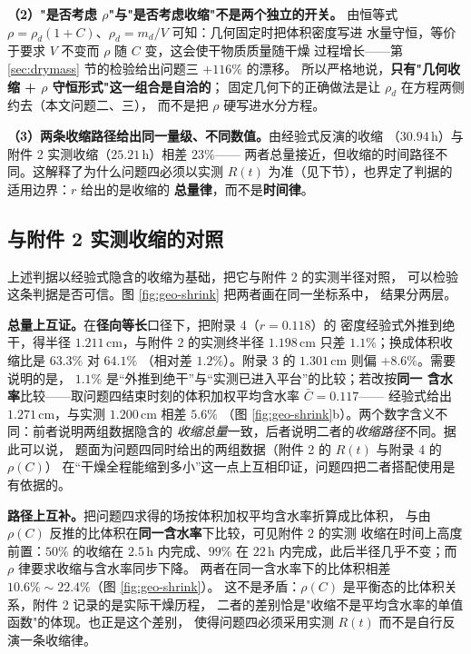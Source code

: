 \documentclass[12pt,a4paper,fontset=none]{ctexart}
\begin{document}
\textbf{（2）"是否考虑 $\rho$"与"是否考虑收缩"不是两个独立的开关。}
由恒等式 $\rho=\rho_d(1+C)$、$\rho_d=m_d/V$ 可知：几何固定时把体积密度写进
水量守恒，等价于要求 $V$ 不变而 $\rho$ 随 $C$ 变，这会使干物质质量随干燥
过程增长——第 \ref{sec:drymass} 节的检验给出问题三 $+116\%$ 的漂移。
所以严格地说，\textbf{只有"几何收缩 + $\rho$ 守恒形式"这一组合是自洽的}；
固定几何下的正确做法是让 $\rho_d$ 在方程两侧约去（本文问题二、三），
而不是把 $\rho$ 硬写进水分方程。

\textbf{（3）两条收缩路径给出同一量级、不同数值。}由经验式反演的收缩
（$30.94$\,h）与附件 2 实测收缩（$25.21$\,h）相差 $23\%$——
两者总量接近，但收缩的时间路径不同。这解释了为什么问题四必须以实测
$R(t)$ 为准（见下节），也界定了判据的适用边界：$r$ 给出的是收缩的
\textbf{总量律}，而不是\textbf{时间律}。

\subsection{与附件 2 实测收缩的对照}
\label{sec:p11-crosscheck}

上述判据以经验式隐含的收缩为基础，把它与附件 2 的实测半径对照，
可以检验这条判据是否可信。图 \ref{fig:geo-shrink} 把两者画在同一坐标系中，
结果分两层。

\textbf{总量上互证。}在\textbf{径向等长}口径下，把附录 4（$r=0.118$）的
密度经验式外推到绝干，得半径 $1.211$\,cm，与附件 2 的实测终半径
$1.198$\,cm 只差 $1.1\%$；换成体积收缩比是 $63.3\%$ 对 $64.1\%$
（相对差 $1.2\%$）。附录 3 的 $1.301$\,cm 则偏 $+8.6\%$。需要说明的是，
$1.1\%$ 是“外推到绝干”与“实测已进入平台”的比较；若改按\textbf{同一
含水率}比较——取问题四结束时刻的体积加权平均含水率 $\bar C=0.117$——
经验式给出 $1.271$\,cm，与实测 $1.200$\,cm 相差 $5.6\%$
（图 \ref{fig:geo-shrink}b）。两个数字含义不同：前者说明两组数据隐含的
\emph{收缩总量}一致，后者说明二者的\emph{收缩路径}不同。据此可以说，
题面为问题四同时给出的两组数据（附件 2 的 $R(t)$ 与附录 4 的 $\rho(C)$）
在“干燥全程能缩到多小”这一点上互相印证，问题四把二者搭配使用是有依据的。

\textbf{路径上互补。}把问题四求得的场按体积加权平均含水率折算成比体积，
与由 $\rho(C)$ 反推的比体积在\textbf{同一含水率}下比较，可见附件 2 的实测
收缩在时间上高度前置：$50\%$ 的收缩在 $2.5$\,h 内完成、$99\%$ 在 $22$\,h
内完成，此后半径几乎不变；而 $\rho$ 律要求收缩与含水率同步下降。
两者在同一含水率下的比体积相差 $10.6\%\sim22.4\%$（图 \ref{fig:geo-shrink}）。
这不是矛盾：$\rho(C)$ 是平衡态的比体积关系，附件 2 记录的是实际干燥历程，
二者的差别恰是"收缩不是平均含水率的单值函数"的体现。也正是这个差别，
使得问题四必须采用实测 $R(t)$ 而不是自行反演一条收缩律。
\end{document}
